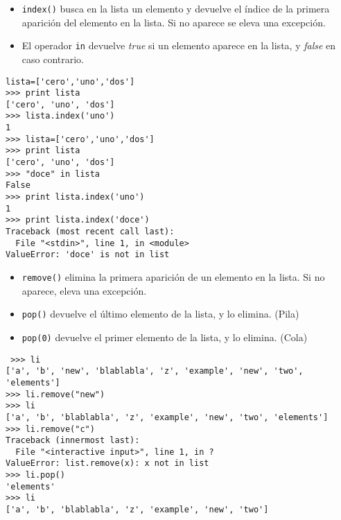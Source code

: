 \documentclass[ucs]{beamer}
\begin{document}
\begin{frame}[fragile]
\begin{itemize}
\item \verb|index()| busca en la lista un elemento y devuelve el
  índice de la primera aparición del elemento en la lista. Si no
  aparece se eleva una excepción.
\item El operador \verb|in| devuelve \emph{true}  si un elemento aparece en la
  lista, y \emph{false} en caso contrario.
\end{itemize}

\begin{scriptsize}
\begin{verbatim}
lista=['cero','uno','dos']
>>> print lista
['cero', 'uno', 'dos']
>>> lista.index('uno')
1
>>> lista=['cero','uno','dos']
>>> print lista
['cero', 'uno', 'dos']
>>> "doce" in lista
False
>>> print lista.index('uno')
1
>>> print lista.index('doce')
Traceback (most recent call last):
  File "<stdin>", line 1, in <module>
ValueError: 'doce' is not in list
\end{verbatim}
\end{scriptsize}

\end{frame}




\begin{frame}[fragile]

\begin{itemize}
\item \verb|remove()| elimina la primera aparición de un elemento en
  la lista. Si no aparece, eleva una excepción.
\item \verb|pop()| devuelve el último elemento de la lista, y lo elimina. (Pila) 
\item \verb|pop(0)| devuelve el primer elemento de la lista, y lo elimina. (Cola)
\end{itemize}

\begin{scriptsize}
\begin{verbatim}
 >>> li
['a', 'b', 'new', 'blablabla', 'z', 'example', 'new', 'two', 'elements']
>>> li.remove("new") 
>>> li
['a', 'b', 'blablabla', 'z', 'example', 'new', 'two', 'elements']
>>> li.remove("c")   
Traceback (innermost last):
  File "<interactive input>", line 1, in ?
ValueError: list.remove(x): x not in list
>>> li.pop()         
'elements'
>>> li
['a', 'b', 'blablabla', 'z', 'example', 'new', 'two'] 
\end{verbatim}
\end{scriptsize}

\end{frame}
\end{document}
